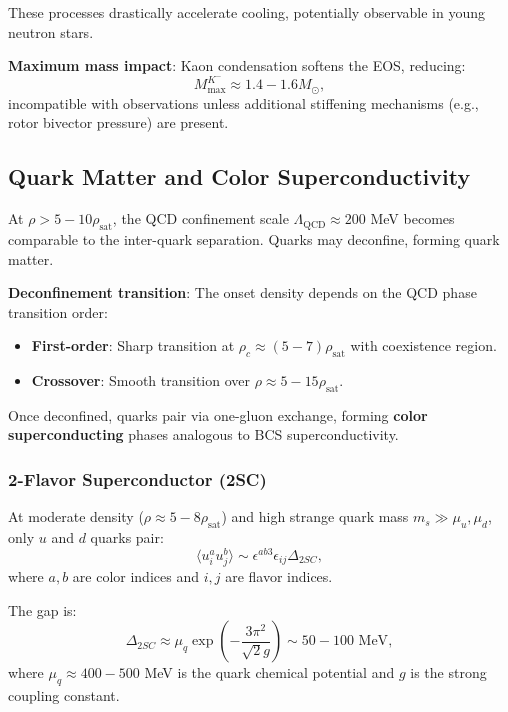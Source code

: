 \documentclass[12pt,a4paper]{article}
\theoremstyle{definition}
\theoremstyle{remark}
\begin{document}
These processes drastically accelerate cooling, potentially observable in young neutron stars.

\textbf{Maximum mass impact}: Kaon condensation softens the EOS, reducing:
\begin{equation}
M_{\text{max}}^{K^-} \approx 1.4-1.6 M_\odot,
\end{equation}
incompatible with observations unless additional stiffening mechanisms (e.g., rotor bivector pressure) are present.

\subsection{Quark Matter and Color Superconductivity}

At $\rho > 5-10 \rho_{\text{sat}}$, the QCD confinement scale $\Lambda_{\text{QCD}} \approx 200$ MeV becomes comparable to the inter-quark separation. Quarks may deconfine, forming quark matter.

\textbf{Deconfinement transition}: The onset density depends on the QCD phase transition order:
\begin{itemize}
\item \textbf{First-order}: Sharp transition at $\rho_c \approx (5-7) \rho_{\text{sat}}$ with coexistence region.
\item \textbf{Crossover}: Smooth transition over $\rho \approx 5-15 \rho_{\text{sat}}$.
\end{itemize}

Once deconfined, quarks pair via one-gluon exchange, forming \textbf{color superconducting} phases analogous to BCS superconductivity.

\subsubsection{2-Flavor Superconductor (2SC)}

At moderate density ($\rho \approx 5-8 \rho_{\text{sat}}$) and high strange quark mass $m_s \gg \mu_u, \mu_d$, only $u$ and $d$ quarks pair:
\begin{equation}
\langle u_i^a u_j^b \rangle \sim \epsilon^{ab3} \epsilon_{ij} \Delta_{2SC},
\end{equation}
where $a,b$ are color indices and $i,j$ are flavor indices.

The gap is:
\begin{equation}
\Delta_{2SC} \approx \mu_q \exp\left(-\frac{3\pi^2}{\sqrt{2} g}\right) \sim 50-100 \text{ MeV},
\end{equation}
where $\mu_q \approx 400-500$ MeV is the quark chemical potential and $g$ is the strong coupling constant.
\end{document}
